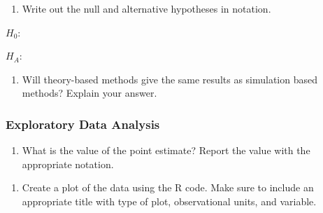\documentclass[
]{report}
\providecommand{\tightlist}{%
  \setlength{\itemsep}{0pt}\setlength{\parskip}{0pt}}
\begin{document}
\begin{enumerate}
\def\labelenumi{\arabic{enumi}.}
\setcounter{enumi}{1}
\tightlist
\item
  Write out the null and alternative hypotheses in notation.
\end{enumerate}

\vspace{1mm}

\(H_0:\)

\vspace{0.3in}

\(H_A:\)

\vspace{0.3in}

\begin{enumerate}
\def\labelenumi{\arabic{enumi}.}
\setcounter{enumi}{2}
\tightlist
\item
  Will theory-based methods give the same results as simulation based methods? Explain your answer.
\end{enumerate}

\vspace{1in}

\subsubsection*{Exploratory Data Analysis}\label{exploratory-data-analysis}

\begin{enumerate}
\def\labelenumi{\arabic{enumi}.}
\setcounter{enumi}{3}
\tightlist
\item
  What is the value of the point estimate? Report the value with the appropriate notation.
\end{enumerate}

\vspace{0.3in}

\begin{enumerate}
\def\labelenumi{\arabic{enumi}.}
\setcounter{enumi}{4}
\tightlist
\item
  Create a plot of the data using the R code. Make sure to include an appropriate title with type of plot, observational units, and variable.
\end{enumerate}
\end{document}
